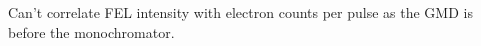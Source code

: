 Can't correlate FEL intensity with electron counts per pulse as the GMD is before the monochromator. 